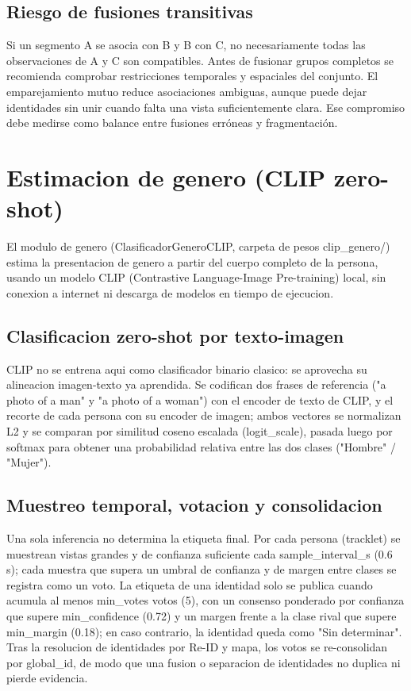 \documentclass[12pt,letterpaper]{article}
\begin{document}
\subsection{Riesgo de fusiones transitivas}
Si un segmento A se asocia con B y B con C, no necesariamente todas las observaciones de A y C son compatibles. Antes de fusionar grupos completos se recomienda comprobar restricciones temporales y espaciales del conjunto. El emparejamiento mutuo reduce asociaciones ambiguas, aunque puede dejar identidades sin unir cuando falta una vista suficientemente clara. Ese compromiso debe medirse como balance entre fusiones erróneas y fragmentación.

\section{Estimacion de genero (CLIP zero-shot)}

El modulo de genero (ClasificadorGeneroCLIP, carpeta de pesos clip\_\allowbreak genero/) estima la presentacion de genero a partir del cuerpo completo de la persona, usando un modelo CLIP (Contrastive Language-Image Pre-training) local, sin conexion a internet ni descarga de modelos en tiempo de ejecucion.


\subsection{Clasificacion zero-shot por texto-imagen}

CLIP no se entrena aqui como clasificador binario clasico: se aprovecha su alineacion imagen-texto ya aprendida. Se codifican dos frases de referencia ("a photo of a man" y "a photo of a woman") con el encoder de texto de CLIP, y el recorte de cada persona con su encoder de imagen; ambos vectores se normalizan L2 y se comparan por similitud coseno escalada (logit\_\allowbreak scale), pasada luego por softmax para obtener una probabilidad relativa entre las dos clases ("Hombre" / "Mujer").


\subsection{Muestreo temporal, votacion y consolidacion}

Una sola inferencia no determina la etiqueta final. Por cada persona (tracklet) se muestrean vistas grandes y de confianza suficiente cada sample\_\allowbreak interval\_\allowbreak s (0.6 s); cada muestra que supera un umbral de confianza y de margen entre clases se registra como un voto. La etiqueta de una identidad solo se publica cuando acumula al menos min\_\allowbreak votes votos (5), con un consenso ponderado por confianza que supere min\_\allowbreak confidence (0.72) y un margen frente a la clase rival que supere min\_\allowbreak margin (0.18); en caso contrario, la identidad queda como "Sin determinar". Tras la resolucion de identidades por Re-ID y mapa, los votos se re-consolidan por global\_\allowbreak id, de modo que una fusion o separacion de identidades no duplica ni pierde evidencia.
\end{document}

